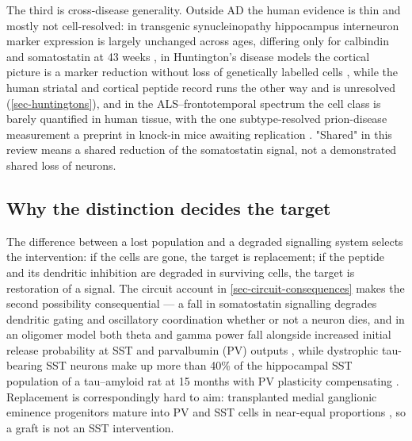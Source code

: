 \documentclass[11pt]{article}
\begin{document}
The third is cross-disease generality. Outside AD the human evidence is thin and mostly not cell-resolved: in transgenic synucleinopathy hippocampus interneuron marker expression is largely unchanged across ages, differing only for calbindin and somatostatin at 43 weeks \citep{FloresCuadrado2016}, in Huntington's disease models the cortical picture is a marker reduction without loss of genetically labelled cells \citep{Voelkl2022}, while the human striatal and cortical peptide record runs the other way and is unresolved (\ref{sec-huntingtons}), and in the ALS--frontotemporal spectrum the cell class is barely quantified in human tissue, with the one subtype-resolved prion-disease measurement a preprint in knock-in mice awaiting replication \citep{Bauer2022a}. "Shared" in this review means a shared reduction of the somatostatin signal, not a demonstrated shared loss of neurons.

\subsection{Why the distinction decides the target}
\label{sec-12-why-it-matters}

The difference between a lost population and a degraded signalling system selects the intervention: if the cells are gone, the target is replacement; if the peptide and its dendritic inhibition are degraded in surviving cells, the target is restoration of a signal. The circuit account in \ref{sec-circuit-consequences} makes the second possibility consequential --- a fall in somatostatin signalling degrades dendritic gating and oscillatory coordination whether or not a neuron dies, and in an oligomer model both theta and gamma power fall alongside increased initial release probability at SST and parvalbumin (PV) outputs \citep{Chung2020}, while dystrophic tau-bearing SST neurons make up more than 40\% of the hippocampal SST population of a tau--amyloid rat at 15 months with PV plasticity compensating \citep{Morrone2022}. Replacement is correspondingly hard to aim: transplanted medial ganglionic eminence progenitors mature into PV and SST cells in near-equal proportions \citep{Yokomizo2025a}, so a graft is not an SST intervention.
\end{document}
